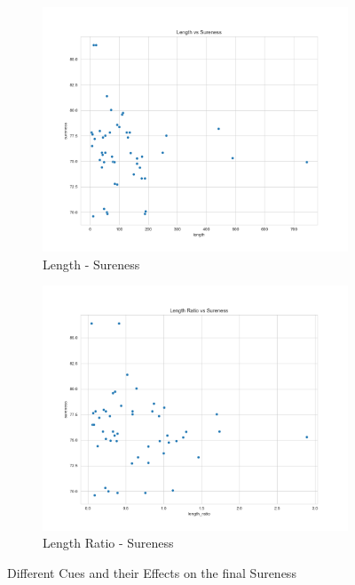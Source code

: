\documentclass[11pt, oneside]{article}   	%
\begin{document}
\begin{figure}[H]
\begin{subfigure}{.5\textwidth}
  \centering
  \includegraphics[width=\linewidth]{../plots/fnn_data/length_vs_sureness}
  \caption{Length - Sureness}
\end{subfigure}%
\begin{subfigure}{.5\textwidth}
  \centering
  \includegraphics[width=\linewidth]{../plots/fnn_data/length_ratio_vs_sureness}
  \caption{Length Ratio - Sureness}
\end{subfigure}
\caption{Different Cues and their Effects on the final Sureness}
\end{figure}
\end{document}

